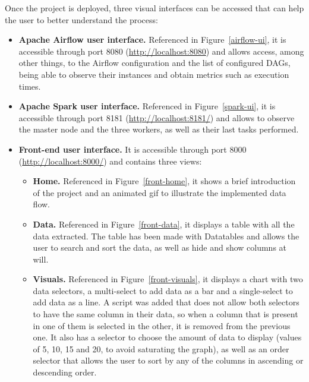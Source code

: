 \nonzeroparskip Once the project is deployed, three visual interfaces can be accessed that can help the user to better understand the process:
\begin{itemize}
	 \item \textbf{Apache Airflow user interface.} Referenced in Figure~\ref{airflow-ui}, it is accessible through port 8080 (\url{http://localhost:8080}) and allows access, among other things, to the Airflow configuration and the list of configured DAGs, being able to observe their instances and obtain metrics such as execution times.
	 \item \textbf{Apache Spark user interface.} Referenced in Figure~\ref{spark-ui}, it is accessible through port 8181 (\url{http://localhost:8181/}) and allows to observe the master node and the three workers, as well as their last tasks performed.
	 \item \textbf{Front-end user interface.} It is accessible through port 8000 (\url{http://localhost:8000/}) and contains three views:
	 \begin{itemize}
	 	\item \textbf{Home.} Referenced in Figure~\ref{front-home}, it shows a brief introduction of the project and an animated gif to illustrate the implemented data flow.
	 	\item \textbf{Data.} Referenced in Figure~\ref{front-data}, it displays a table with all the data extracted. The table has been made with Datatables and allows the user to search and sort the data, as well as hide and show columns at will.
	 	\item \textbf{Visuals.} Referenced in Figure~\ref{front-visuals}, it displays a chart with two data selectors, a multi-select to add data as a bar and a single-select to add data as a line. A script was added that does not allow both selectors to have the same column in their data, so when a column that is present in one of them is selected in the other, it is removed from the previous one. It also has a selector to choose the amount of data to display (values of 5, 10, 15 and 20, to avoid saturating the graph), as well as an order selector that allows the user to sort by any of the columns in ascending or descending order.
	 \end{itemize}
\end{itemize}



